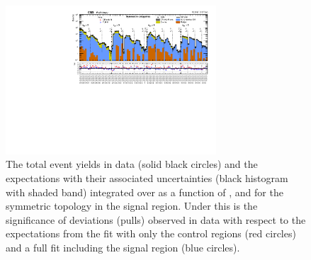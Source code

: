 \begin{figure}[!htb]
  \begin{center}
    \includegraphics[angle=90,width=0.7\textwidth]{figs/analysis/results/summaryPlot_Symmetric_prefit_overlay_fit_b}
    \caption{The total event yields in data (solid black circles)
      and the \SM expectations with their associated uncertainties (black
      histogram with shaded band) integrated over \MHT as a function of
      \nj, \nb and \HT for the symmetric topology in the
      signal region. Under this is the significance of deviations
      (pulls) observed in data with respect to the \SM expectations
      from the fit with only the control regions (red circles) and a
      full fit including the signal region (blue circles).}
    \label{fig:sym}
  \end{center}
\end{figure}

